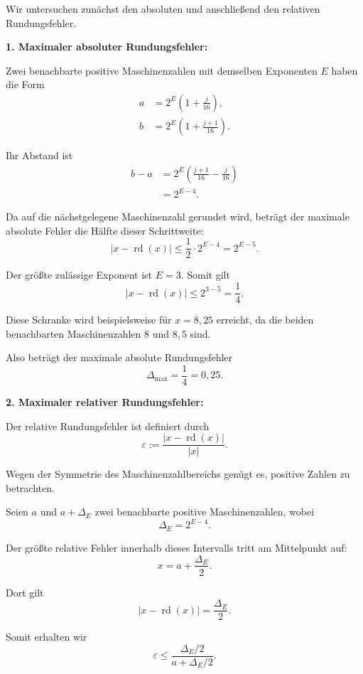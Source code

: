 \documentclass{report}
\begin{document}
\begin{myproof}
  Wir untersuchen zunächst den absoluten
  und anschließend den relativen Rundungsfehler.

  \medskip
  \textbf{1. Maximaler absoluter Rundungsfehler:}

  Zwei benachbarte positive Maschinenzahlen
  mit demselben Exponenten $E$ haben die Form
  \begin{align*}
    a&=2^E\left(1+\frac j{16}\right),\\
    b&=2^E\left(1+\frac{j+1}{16}\right).
  \end{align*}

  Ihr Abstand ist
  \begin{align*}
    b-a
    &=2^E\left(
      \frac{j+1}{16}-\frac j{16}
    \right)\\
    &=2^{E-4}.
  \end{align*}

  Da auf die nächstgelegene Maschinenzahl
  gerundet wird, beträgt der maximale
  absolute Fehler die Hälfte dieser Schrittweite:
  \[
    |x-\operatorname{rd}(x)|
    \le\frac12\cdot2^{E-4}
    =2^{E-5}.
  \]

  Der größte zulässige Exponent ist $E=3$.
  Somit gilt
  \[
    |x-\operatorname{rd}(x)|
    \le2^{3-5}
    =\frac14.
  \]

  Diese Schranke wird beispielsweise für
  $x=8{,}25$ erreicht, da die beiden
  benachbarten Maschinenzahlen $8$ und
  $8{,}5$ sind.

  Also beträgt der maximale absolute
  Rundungsfehler
  \[
    \boxed{\Delta_{\max}=\frac14=0{,}25.}
  \]

  \medskip
  \textbf{2. Maximaler relativer Rundungsfehler:}

  Der relative Rundungsfehler ist definiert durch
  \[
    \varepsilon
    :=\frac{|x-\operatorname{rd}(x)|}{|x|}.
  \]

  Wegen der Symmetrie des Maschinenzahlbereichs
  genügt es, positive Zahlen zu betrachten.

  Seien $a$ und $a+\Delta_E$ zwei benachbarte
  positive Maschinenzahlen, wobei
  \[
    \Delta_E=2^{E-4}.
  \]

  Der größte relative Fehler innerhalb dieses
  Intervalls tritt am Mittelpunkt auf:
  \[
    x=a+\frac{\Delta_E}{2}.
  \]

  Dort gilt
  \[
    |x-\operatorname{rd}(x)|
    =\frac{\Delta_E}{2}.
  \]

  Somit erhalten wir
  \[
    \varepsilon
    \le
    \frac{\Delta_E/2}
         {a+\Delta_E/2}.
  \]


\end{myproof}
\end{document}
